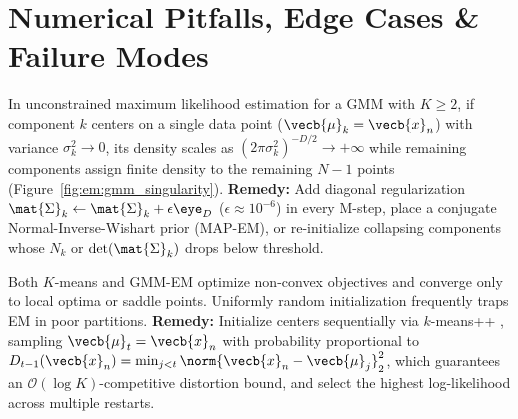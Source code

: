 \documentclass[../../../../master.tex]{subfiles}
\begin{document}
\section{Numerical Pitfalls, Edge Cases \& Failure Modes}
\label{sec:em:pitfalls}

\begin{pitfall}
\label{pit:em:singularity}
In unconstrained maximum likelihood estimation for a GMM with $K \ge 2$, if component $k$ centers on a single data point ($\vecb{\mu}_k = \vecb{x}_n$) with variance $\sigma_k^2 \to 0$, its density scales as $(2\pi \sigma_k^2)^{-D/2} \to +\infty$ while remaining components assign finite density to the remaining $N-1$ points  (Figure~\ref{fig:em:gmm_singularity}). \textbf{Remedy:} Add diagonal regularization $\mat{\Sigma}_k \leftarrow \mat{\Sigma}_k + \epsilon\eye_D$ ($\epsilon \approx 10^{-6}$) in every M-step, place a conjugate Normal-Inverse-Wishart prior (MAP-EM), or re-initialize collapsing components whose $N_k$ or $\det(\mat{\Sigma}_k)$ drops below threshold.
\end{pitfall}


\begin{pitfall}
\label{pit:em:local_optima}
Both $K$-means and GMM-EM optimize non-convex objectives and converge only to local optima or saddle points. Uniformly random initialization frequently traps EM in poor partitions. \textbf{Remedy:} Initialize centers sequentially via $k$-means++ , sampling $\vecb{\mu}_t = \vecb{x}_n$ with probability proportional to $D_{t-1}(\vecb{x}_n) = \min_{j < t}\norm{\vecb{x}_n - \vecb{\mu}_j}_2^2$, which guarantees an $\mathcal{O}(\log K)$-competitive distortion bound, and select the highest log-likelihood across multiple restarts.
\end{pitfall}
\end{document}
